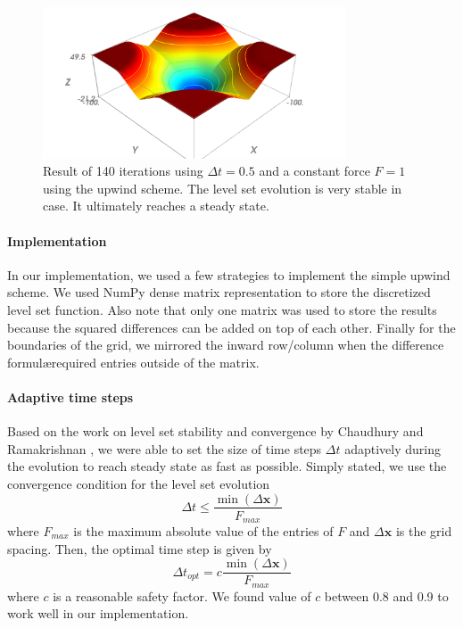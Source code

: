 \documentclass{article}
\begin{document}
\begin{figure}
  \centering
  \includegraphics[width=0.8\textwidth]{img/up02.png}
  \caption{Result of 140 iterations using $\Delta t = 0.5$ and a constant
    force $F=1$ using the upwind scheme. The level set evolution is very
    stable in case. It ultimately reaches a steady state.}
  \label{fig:up3}
\end{figure}

\paragraph{Implementation}
In our implementation, we used a few strategies to implement the simple upwind
scheme. We used NumPy \cite{oliphant-2006-guide} dense matrix representation
to store the discretized level set function. Also note that only one matrix
was used to store the results because the squared differences can be added on
top of each other.  Finally for the boundaries of the grid, we mirrored the
inward row/column when the difference formul\ae\hspace required entries
outside of the matrix.

\paragraph{Adaptive time steps}
Based on the work on level set stability and convergence by Chaudhury and
Ramakrishnan \cite{chaudhury2007stability}, we were able to set the size of
time steps $\Delta t$ adaptively during the evolution to reach steady state as
fast as possible. Simply stated, we use the convergence condition for the level
set evolution
\[
\Delta t \le \frac{\min(\Delta \mathbf{x})}{F_{max}}
\]
where $F_{max}$ is the maximum absolute value of the entries of $F$ and
$\Delta \mathbf{x}$ is the grid spacing. Then, the optimal time step is given
by
\[
\Delta t_{opt} = c \frac{\min(\Delta \mathbf{x})}{F_{max}}
\]
where $c$ is a reasonable safety factor. We found value of $c$ between 0.8 and
0.9 to work well in our implementation.
\end{document}
